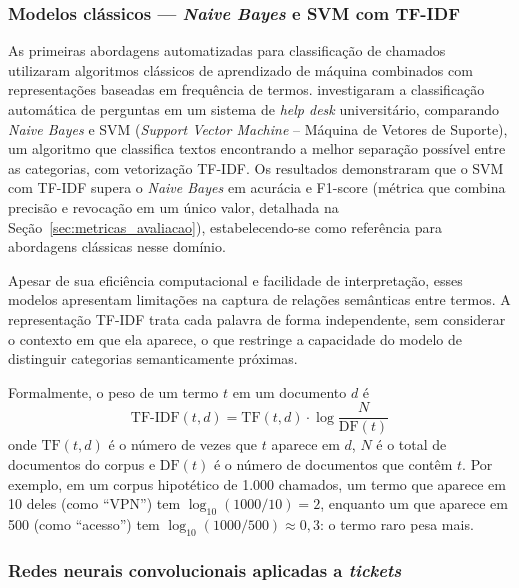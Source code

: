 \documentclass[
    12pt,                %
    openright,           %
    oneside,             %
    a4paper,             %
    english,             %
    brazil               %
]{abntex2}
\begin{document}
\subsubsection{Modelos clássicos — \textit{Naive Bayes} e SVM com TF-IDF}
\label{subsubsec:helpdesk_classicos}

As primeiras abordagens automatizadas para classificação de chamados utilizaram algoritmos clássicos de aprendizado de máquina combinados com representações baseadas em frequência de termos.  investigaram a classificação automática de perguntas em um sistema de \textit{help desk} universitário, comparando \textit{Naive Bayes} e SVM (\textit{Support Vector Machine} -- Máquina de Vetores de Suporte), um algoritmo que classifica textos encontrando a melhor separação possível entre as categorias, com vetorização TF-IDF. Os resultados demonstraram que o SVM com TF-IDF supera o \textit{Naive Bayes} em acurácia e F1-score (métrica que combina precisão e revocação em um único valor, detalhada na Seção~\ref{sec:metricas_avaliacao}), estabelecendo-se como referência para abordagens clássicas nesse domínio.

Apesar de sua eficiência computacional e facilidade de interpretação, esses modelos apresentam limitações na captura de relações semânticas entre termos. A representação TF-IDF trata cada palavra de forma independente, sem considerar o contexto em que ela aparece, o que restringe a capacidade do modelo de distinguir categorias semanticamente próximas.

Formalmente, o peso de um termo $t$ em um documento $d$ é
\begin{equation}
\text{TF-IDF}(t,d) = \text{TF}(t,d) \cdot \log\frac{N}{\text{DF}(t)}
\end{equation}
onde $\text{TF}(t,d)$ é o número de vezes que $t$ aparece em $d$, $N$ é o total de documentos do corpus e $\text{DF}(t)$ é o número de documentos que contêm $t$. Por exemplo, em um corpus hipotético de 1.000 chamados, um termo que aparece em 10 deles (como ``VPN'') tem $\log_{10}(1000/10) = 2$, enquanto um que aparece em 500 (como ``acesso'') tem $\log_{10}(1000/500) \approx 0{,}3$: o termo raro pesa mais.

\subsubsection{Redes neurais convolucionais aplicadas a \textit{tickets}}
\label{subsubsec:helpdesk_cnn}
\end{document}
